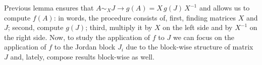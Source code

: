 Previous lemma ensures that $A \sim_{X} J\rightarrow g(A) = X\,g(J)\,X^{-1}$
and allows us to compute $f(A)$: in words, the procedure consists of, first,
finding matrices $X$ and $J$; second, compute $g(J)$; third, multiply it by $X$
on the left side and by $X^{-1}$ on the right side. Now, to study the
application of $f$ to $J$ we can focus on the application of $f$ to the Jordan
block $J_{i}$ due to the block-wise structure of matrix $J$ and, lately,
compose results block-wise as well. 
\iffalse %
f(J) = \left[ \begin{array}{ccc}
        f(J_{1}) \\
        & \ddots \\
        & & f(J_{\nu}) \\
\end{array} \right] \in\mathbb{R}^{m\times m}
\end{displaymath}
\fi

